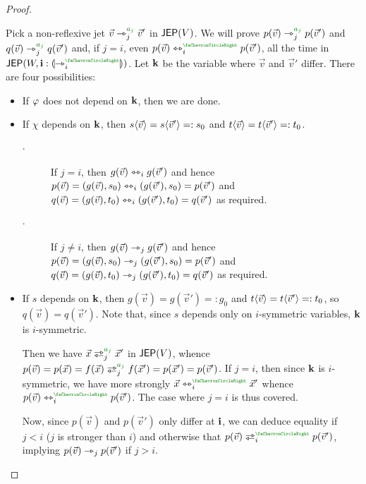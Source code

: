\documentclass[a4paper]{memoir}
\begin{document}
\begin{proof}
\begin{itemize}
\begin{itemize}
\begin{itemize}
				Pick a non-reflexive jet $\vec v \jet_j\pmr{a_j} \vec v'$ in $\mathsf{JEP}(V)$.
				We will prove $p(\vec v) \jet_j\pmr{a_j} p(\vec v')$ and $q(\vec v) \jet_j\pmr{a_j} q(\vec v')$ and, if $j = i$, even $p(\vec v) \equijet_i\pmr{\ypolar} p(\vec v')$, all the time in $\JEP(W, \dm i : \rival{\jet_i\pmr{\ypolar}})$.
				Let $\mathbf{k}$ be the variable where $\vec v$ and $\vec v'$ differ.
				There are four possibilities:
				\begin{itemize}
					\item If $\varphi$ does not depend on $\mathbf{k}$, then we are done.
					\item If $\chi$ depends on $\mathbf{k}$, then $s \langle \vec v \rangle = s \langle \vec v' \rangle =: s_0$ and $t \langle \vec v \rangle = t \langle \vec v' \rangle =: t_0$.
					\begin{description}
						\item[$\cdot$] If $j = i$, then $g(\vec v) \leftrightarrowtriangle_i g(\vec v')$ and hence $p(\vec v) = (g(\vec v), s_0) \leftrightarrowtriangle_i (g(\vec v'), s_0) = p(\vec v')$ and $q(\vec v) = (g(\vec v), t_0) \leftrightarrowtriangle_i (g(\vec v'), t_0) = q(\vec v')$ as required.
						\item[$\cdot$] If $j \neq i$, then $g(\vec v) \rightarrowtriangle_j g(\vec v')$ and hence $p(\vec v) = (g(\vec v), s_0) \rightarrowtriangle_j (g(\vec v'), s_0) = p(\vec v')$ and $q(\vec v) = (g(\vec v), t_0) \rightarrowtriangle_j (g(\vec v'), t_0) = q(\vec v')$ as required.
					\end{description}
					\item If $s$ depends on $\mathbf{k}$, then $g(\vec v) = g(\vec v') =: g_0$ and $t \langle \vec v \rangle = t \langle \vec v' \rangle =: t_0$, so $q(\vec v) = q(\vec v')$.
					Note that, since $s$ depends only on $i$-symmetric variables, $\mathbf{k}$ is $i$-symmetric.
					
					\introtauxx{}
					Then we have $\vec x \infrajet_j\pmr{a_j} \vec x'$ in $\mathsf{JEP}(V)$, whence $p(\vec v) = p(\vec x) = f(\vec x) \infrajet_j\pmr{a_j} f(\vec x') = p(\vec x') = p(\vec v')$.
					If $j = i$, then since $\mathbf{k}$ is $i$-symmetric, we have more strongly $\vec x \equijet_i\pmr{\ypolar} \vec x'$ whence $p(\vec v) \equijet_i\pmr{\ypolar} p(\vec v')$.
					The case where $j = i$ is thus covered.
					
					Now, since $p(\vec v)$ and $p(\vec v')$ only differ at $\mathbf{i}$, we can deduce equality if $j < i$ ($j$ is stronger than $i$) and otherwise that $p(\vec v) \infrajet_i\pmr{\ypolar} p(\vec v')$, implying $p(\vec v) \rightarrowtriangle_j p(\vec v')$ if $j > i$.
					

\end{itemize}
\end{itemize}
\end{itemize}
\end{itemize}
\end{proof}
\end{document}
